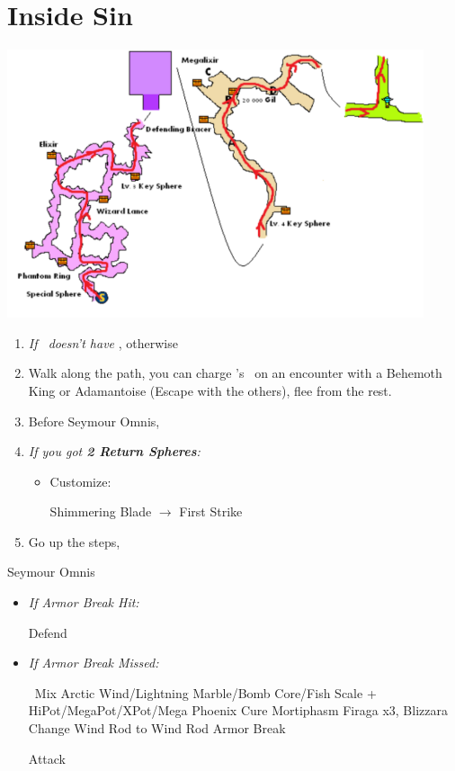 \chapter{Inside Sin}
\includegraphics{graphics/sinpath}
\begin{enumerate}
    \item \textit{If \rikku\ doesn't have \od} \formation{\tidus}{\auron}{\rikku}, otherwise \formation{\tidus}{\auron}{\kimahri}
    \item Walk along the path, you can charge \rikku's \od\ on an encounter with a Behemoth King or Adamantoise (Escape with the others), flee from the rest.
    \item Before Seymour Omnis, \formation{\tidus}{\auron}{\yuna}
    \item \textit{If you got \textbf{2 Return Spheres}:}
    \begin{itemize}
        \item Customize:
        \begin{itemize}
            \auronf Shimmering Blade $\rightarrow$ First Strike
        \end{itemize}
    \end{itemize}
    \item Go up the steps, \sd
\end{enumerate}
\bothvfill\winvfill\lossvfill
\begin{battle}[80000]{Seymour Omnis}
    \begin{itemize}
        \yunaf Defend
        \tidusf Armor Break
        \item \textit{If Armor Break Hit:}
        \begin{itemize}
            \auronf Defend
        \end{itemize}
        \item \textit{If Armor Break Missed:}
        \begin{itemize}
            \switch{\auron}{\rikku}
            \rikkuf \od\ Mix Arctic Wind/Lightning Marble/Bomb Core/Fish Scale + HiPot/MegaPot/XPot/Mega Phoenix
            \yunaf Cure Mortiphasm
            \enemyf Firaga x3, Blizzara
            \yunaf Change Wind Rod to Wind Rod
            \tidusf Armor Break
        \end{itemize}
        \summon{\bahamut}
        \bahamutf Attack
    \end{itemize}
\end{battle}
